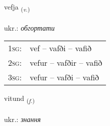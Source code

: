 \documentclass[frontgrid, backgrid]{flacards}\usepackage[]{graphicx}\usepackage[]{xcolor}
\begin{document}
\renewcommand{\flhead}{\vskip5pt \fboxsep=0pt {\small\bfseries\footnotesize Sagnorð | дієслово}}
\renewcommand{\fcfoot}{\vskip5pt \fboxsep=0pt \hspace{2pt}{\small\bfseries\footnotesize 3K}}

\renewcommand{\blhead}{\vskip5pt {\small\bfseries\footnotesize Sagnorð | дієслово }}
\renewcommand{\bcfoot}{\vskip5pt \hspace{2pt}{\small\bfseries\footnotesize 3K}}


{vefja \small{\textsubscript{(\textit{v.})}} \\[1ex] %
\textphonetic{[vɛvja]} \\
ukr.: \emph{обгортати} \\  [2ex]
\renewcommand*{\arraystretch}{0.8}
\begin{tabular}{p{1cm}l}
\textsc{1sg}: & vef -- vafði -- vafið \\ 
\textsc{2sg}: & vefur -- vafðir -- vafið \\ 
\textsc{3sg}: & vefur -- vafði -- vafið \\ 
\end{tabular}
}

\renewcommand{\flhead}{\vskip5pt \fboxsep=0pt {\small\bfseries\footnotesize Nafnorð | іменник}}
\renewcommand{\fcfoot}{\vskip5pt \fboxsep=0pt \hspace{2pt}{\small\bfseries\footnotesize 3K}}

\renewcommand{\blhead}{\vskip5pt {\small\bfseries\footnotesize Nafnorð | іменник }}
\renewcommand{\bcfoot}{\vskip5pt \hspace{2pt}{\small\bfseries\footnotesize 3K}}


{vitund \small{\textsubscript{(\textit{f.})}} \\[1ex] %
\textphonetic{[vɪːtʏnt]} \\
ukr.: \emph{знання} \\  [2ex]
\renewcommand*{\arraystretch}{0.8}
}
\end{document}
